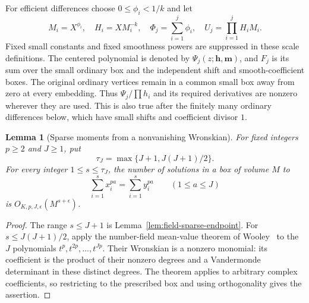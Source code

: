\documentclass[11pt]{amsart}
\newtheorem{lemma}[theorem]{Lemma}
\theoremstyle{definition}
\numberwithin{equation}{section}
\begin{document}
For efficient differences choose $0\le\phi_i<1/k$ and let
\[
 M_i=X^{\phi_i},\quad H_i=X M_i^{-k},\quad
 \Phi_j=\sum_{i=1}^j\phi_i,\quad
 U_j=\prod_{i=1}^jH_iM_i.
\]
Fixed small constants and fixed smoothness powers are suppressed in these
scale definitions. The centered polynomial is denoted by $\Psi_j(z;\mathbf
h,\mathbf m)$, and $F_j$ is its sum over the small ordinary box and the
independent shift and smooth-coefficient boxes. The original ordinary
vertices remain in a common small box away from zero at every embedding.
Thus $\Psi_j/\prod h_i$ and its required derivatives are nonzero wherever
they are used. This is also true after the finitely many ordinary differences
below, which have small shifts and coefficient divisor $1$.

\begin{lemma}[Sparse moments from a nonvanishing Wronskian]
\label{lem:field-sparse-wronskian}
For fixed integers $p\ge2$ and $J\ge1$, put
\[
 \tau_J=\max\{J+1,J(J+1)/2\}.
\]
For every integer $1\le s\le\tau_J$, the number of solutions in a
box of volume $M$ to
\[
 \sum_{i=1}^s x_i^{pa}=\sum_{i=1}^s y_i^{pa}
 \qquad(1\le a\le J)
\]
is $O_{K,p,J,\epsilon}(M^{s+\epsilon})$.
\end{lemma}
\begin{proof}
The range $s\le J+1$ is Lemma~\ref{lem:field-sparse-endpoint}.
For $s\le J(J+1)/2$, apply the number-field mean-value theorem
of Wooley~\cite[Theorem~15.1]{Wooley2019} to the $J$ polynomials
$t^p,t^{2p},\ldots,t^{Jp}$. Their Wronskian is a nonzero monomial:
its coefficient is the product of their nonzero degrees and a
Vandermonde determinant in these distinct degrees.
The theorem applies to arbitrary complex coefficients, so restricting
to the prescribed box and using orthogonality gives the assertion.
\end{proof}
\end{document}

